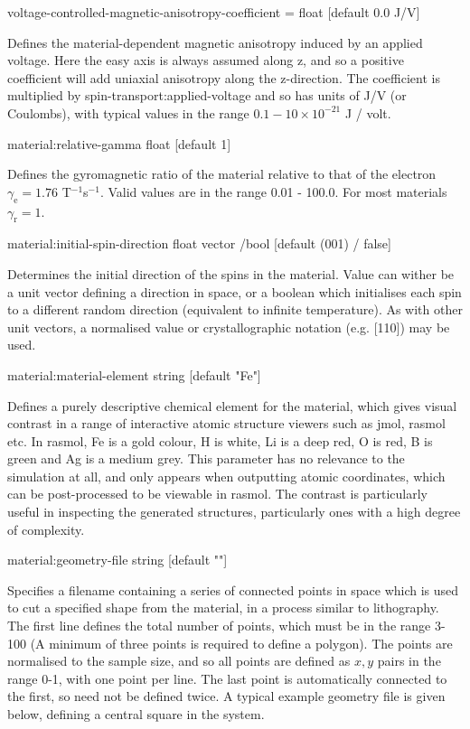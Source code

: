 {\zicf voltage-controlled-magnetic-anisotropy-coefficient = float [default 0.0 J/V]}
Defines the material-dependent magnetic anisotropy induced by an applied voltage.
Here the easy axis is always assumed along z, and so a positive coefficient will
add uniaxial anisotropy along the z-direction. The coefficient is multiplied by
spin-transport:applied-voltage and so has units of J/V (or Coulombs), with typical
values in the range $0.1-10 \times 10^{-21}$ J / volt.


{\zicf material:relative-gamma float [default 1]}
Defines the gyromagnetic ratio of the material relative to that of the electron
$\gamma_{\mathrm{e}} = 1.76$ T$^{-1}$s$^{-1}$. Valid values are in the range
0.01 - 100.0. For most materials $\gamma_{\mathrm{r}} = 1$.

{\zicf material:initial-spin-direction float vector /bool [default (001) / false]}
Determines the initial direction of the spins in the material. Value can wither
be a unit vector defining a direction in space, or a boolean which initialises
each spin to a different random direction (equivalent to infinite temperature).
As with other unit vectors, a  normalised value or crystallographic notation
(e.g. [110]) may be used.

{\zicf material:material-element string [default "Fe"]}
Defines a purely descriptive chemical element for the material, which gives
visual contrast in a range of interactive atomic structure viewers such as jmol,
rasmol etc. In rasmol, Fe is a gold colour, H is white, Li is a deep red, O is
red, B is green and Ag is a medium grey. This parameter has no relevance to the
simulation at all, and only appears when outputting atomic coordinates, which
can be post-processed to be viewable in rasmol. The contrast is particularly
useful in inspecting the generated structures, particularly ones with a high
degree of complexity.

{\zicf material:geometry-file string [default ""]}
Specifies a filename containing a series of connected points in space which is
used to cut a specified shape from the material, in a process similar to
lithography. The first line defines the total number of points, which must be in
the range 3-100 (A minimum of three points is required to define a polygon). The
points are normalised to the sample size, and so all points are defined as $x,y$
pairs in the range 0-1, with one point per line. The last point is automatically
connected to the first, so need not be defined twice. A typical example geometry
file is given below, defining a central square in the system.


